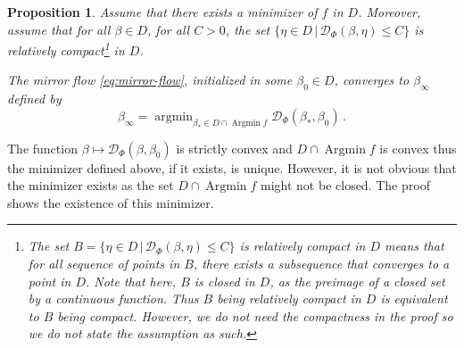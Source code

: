 \documentclass[11pt,reqno]{article}
\DeclareMathOperator*{\argmin}{argmin}
\DeclareMathOperator*{\Argmin}{Argmin}
\newcommand{\cD}{\mathcal{D}}
\renewcommand{\leq}{\leqslant}
\numberwithin{equation}{section}
\theoremstyle{plain}
\newtheorem{proposition}[assumption]{Proposition}
\theoremstyle{definition}
\theoremstyle{remark}
\begin{document}
\begin{proposition}
	\label{prop:implicit-reg-mirror}
	Assume that there exists a minimizer of $f$ in $D$. Moreover, assume that for all $\beta \in D$, for all $C > 0$, the set $\{\eta \in D \, \vert \, \cD_\Phi(\beta, \eta) \leq C\}$ is relatively compact\footnote{The set $B = \{\eta \in D \, \vert \, \cD_\Phi(\beta, \eta) \leq C\}$ is relatively compact in $D$ means that for all sequence of points in $B$, there exists a subsequence that converges to a point in $D$. Note that here, $B$ is closed in $D$, as the preimage of a closed set by a continuous function. Thus $B$ being relatively compact in $D$ is equivalent to $B$ being compact. However, we do not need the compactness in the proof so we do not state the assumption as such.} in $D$. 

	The mirror flow \eqref{eq:mirror-flow}, initialized in some $\beta_0 \in D$, converges to $\beta_\infty$ defined by 
	\begin{equation*}
		\beta_\infty = \argmin_{\beta_* \in D \cap \Argmin f} \cD_\Phi(\beta_*, \beta_0) \, . 
	\end{equation*}
\end{proposition}

The function $\beta \mapsto \cD_\Phi(\beta, \beta_0)$ is strictly convex and $D \cap \Argmin f$ is convex thus the minimizer defined above, if it exists, is unique. However, it is not obvious that the minimizer exists as the set $D \cap \Argmin f$ might not be closed. The proof shows the existence of this minimizer. 
\end{document}
